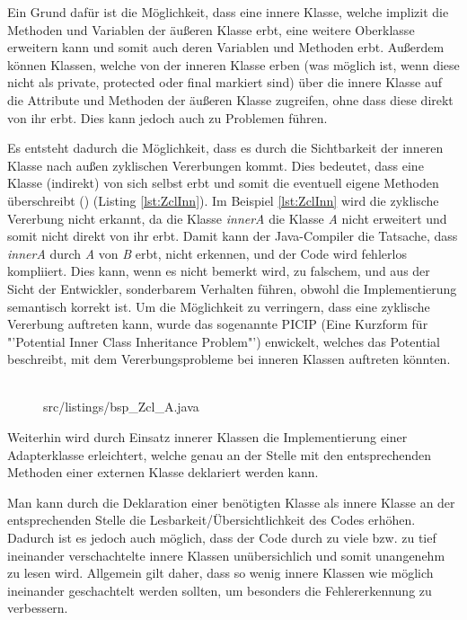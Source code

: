 Ein Grund dafür ist die Möglichkeit, dass eine innere Klasse, welche implizit die Methoden und Variablen der äußeren Klasse erbt, eine weitere Oberklasse erweitern kann und somit auch deren Variablen und Methoden erbt.
Außerdem können Klassen, welche von der inneren Klasse erben (was möglich ist, wenn diese nicht als private, protected oder final markiert sind) über die innere Klasse auf die Attribute und Methoden der äußeren Klasse zugreifen, ohne dass diese direkt von ihr erbt. Dies kann jedoch auch zu Problemen führen.

Es entsteht dadurch die Möglichkeit, dass es durch die Sichtbarkeit der inneren Klasse nach außen zyklischen Vererbungen kommt. Dies bedeutet, dass eine Klasse (indirekt) von sich selbst erbt und somit die eventuell eigene Methoden überschreibt (\cite{DBLP:journals/corr/abs-1301-6260}) (Listing \ref{lst:ZclInn}).
Im Beispiel \ref{lst:ZclInn}  wird die zyklische Vererbung nicht erkannt, da die Klasse {\it innerA} die Klasse {\it A} nicht erweitert und somit nicht direkt von ihr erbt. Damit kann der Java-Compiler die Tatsache, dass {\it innerA} durch {\it A} von {\it B} erbt, nicht erkennen, und der Code wird fehlerlos kompliiert.
Dies kann, wenn es nicht bemerkt wird, zu falschem, und aus der Sicht der Entwickler, sonderbarem Verhalten führen, obwohl die Implementierung semantisch korrekt ist.
Um die Möglichkeit zu verringern, dass eine zyklische Vererbung auftreten kann, wurde das sogenannte PICIP (Eine Kurzform für "'Potential Inner Class Inheritance Problem"') enwickelt, welches das Potential beschreibt, mit dem Vererbungsprobleme bei inneren Klassen auftreten könnten.
\\
\\
\begin{figure}[hbt]
\lstset{language=Java}
 {src/listings/bsp_Zcl_A.java}
\end{figure}
\newpage

Weiterhin wird durch Einsatz innerer Klassen die Implementierung einer Adapterklasse erleichtert, welche genau an der Stelle mit den entsprechenden Methoden einer externen Klasse deklariert werden kann.

Man kann durch die Deklaration einer benötigten Klasse als innere Klasse an der entsprechenden Stelle die Lesbarkeit/Übersichtlichkeit des Codes erhöhen.
Dadurch ist es jedoch auch möglich, dass der Code durch zu viele bzw. zu tief ineinander verschachtelte innere Klassen unübersichlich und somit unangenehm zu lesen wird.
Allgemein gilt daher, dass so wenig innere Klassen wie möglich ineinander geschachtelt werden sollten, um besonders die Fehlererkennung zu verbessern.

